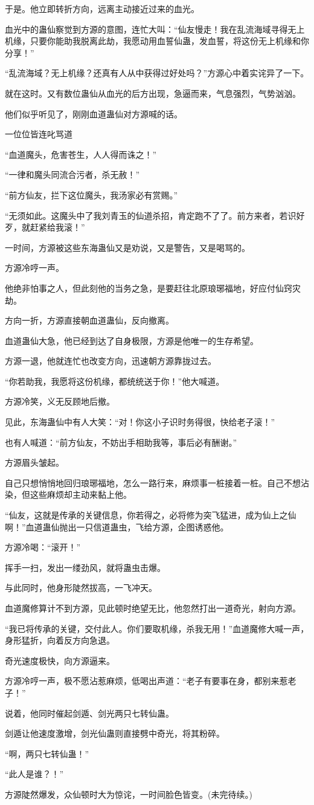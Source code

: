 \begin{this_body}
于是。他立即转折方向，远离主动接近过来的血光。

血光中的蛊仙察觉到方源的意图，连忙大叫：“仙友慢走！我在乱流海域寻得无上机缘，只要你能助我脱离此劫，我愿动用血誓仙蛊，发血誓，将这份无上机缘和你分享！”

“乱流海域？无上机缘？还真有人从中获得过好处吗？”方源心中着实诧异了一下。

就在这时。又有数位蛊仙从血光的后方出现，急逼而来，气息强烈，气势汹汹。

他们似乎听见了，刚刚血道蛊仙对方源喊的话。

一位位皆连叱骂道

“血道魔头，危害苍生，人人得而诛之！”

“一律和魔头同流合污者，杀无赦！”

“前方仙友，拦下这位魔头，我汤家必有赏赐。”

“无须如此。这魔头中了我刘青玉的仙道杀招，肯定跑不了了。前方来者，若识好歹，就赶紧给我滚！”

一时间，方源被这些东海蛊仙又是劝说，又是警告，又是喝骂的。

方源冷哼一声。

他绝非怕事之人，但此刻他的当务之急，是要赶往北原琅琊福地，好应付仙窍灾劫。

方向一折，方源直接朝血道蛊仙，反向撤离。

血道蛊仙大急，他已经到达了自身极限，方源是他唯一的生存希望。

方源一退，他就连忙也改变方向，迅速朝方源靠拢过去。

“你若助我，我愿将这份机缘，都统统送于你！”他大喊道。

方源冷笑，义无反顾地后撤。

见此，东海蛊仙中有人大笑：“对！你这小子识时务得很，快给老子滚！”

也有人喊道：“前方仙友，不妨出手相助我等，事后必有酬谢。”

方源眉头皱起。

自己只想悄悄地回归琅琊福地，怎么一路行来，麻烦事一桩接着一桩。自己不想沾染，但这些麻烦却主动来黏上他。

“仙友，这就是传承的关键信息，你若得之，必将修为突飞猛进，成为仙上之仙啊！”血道蛊仙抛出一只信道蛊虫，飞给方源，企图诱惑他。

方源冷喝：“滚开！”

挥手一扫，发出一缕劲风，就将蛊虫击爆。

与此同时，他身形陡然拔高，一飞冲天。

血道魔修算计不到方源，见此顿时绝望无比，他忽然打出一道奇光，射向方源。

“我已将传承的关键，交付此人。你们要取机缘，杀我无用！”血道魔修大喊一声，身形猛折，向着反方向急退。

奇光速度极快，向方源逼来。

方源冷哼一声，极不愿沾惹麻烦，低喝出声道：“老子有要事在身，都别来惹老子！”

说着，他同时催起剑遁、剑光两只七转仙蛊。

剑遁让他速度激增，剑光仙蛊则直接劈中奇光，将其粉碎。

“啊，两只七转仙蛊！”

“此人是谁？！”

方源陡然爆发，众仙顿时大为惊诧，一时间脸色皆变。(未完待续。)

\end{this_body}

